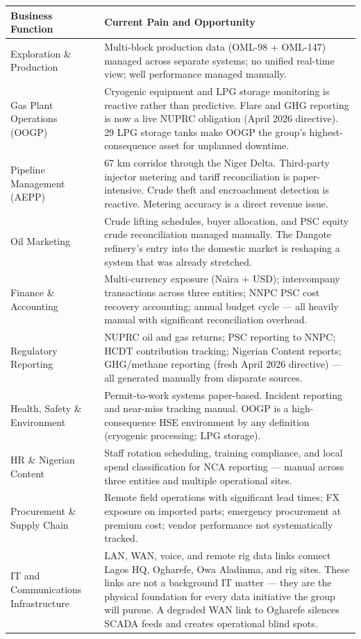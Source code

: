 \documentclass[10pt]{article}
\newcommand{\spacer}{\vspace{10pt}}
\begin{document}
\spacer
\small
\begin{tabularx}{\columnwidth}{@{}lX@{}}
\toprule
\textbf{Business Function} & \textbf{Current Pain and Opportunity} \\
\midrule
Exploration \& Production
  & Multi-block production data (OML-98 + OML-147) managed across separate
    systems; no unified real-time view; well performance managed manually. \\
Gas Plant Operations (OOGP)
  & Cryogenic equipment and LPG storage monitoring is reactive rather than
    predictive. Flare and GHG reporting is now a live NUPRC obligation
    (April 2026 directive). 29 LPG storage tanks make OOGP the group's
    highest-consequence asset for unplanned downtime. \\
Pipeline Management (AEPP)
  & 67 km corridor through the Niger Delta. Third-party injector metering
    and tariff reconciliation is paper-intensive. Crude theft and
    encroachment detection is reactive. Metering accuracy is a direct
    revenue issue. \\
Oil Marketing
  & Crude lifting schedules, buyer allocation, and PSC equity crude
    reconciliation managed manually. The Dangote refinery's entry into the
    domestic market is reshaping a system that was already stretched. \\
Finance \& Accounting
  & Multi-currency exposure (Naira + USD); intercompany transactions across
    three entities; NNPC PSC cost recovery accounting; annual budget cycle ---
    all heavily manual with significant reconciliation overhead. \\
Regulatory Reporting
  & NUPRC oil and gas returns; PSC reporting to NNPC; HCDT contribution
    tracking; Nigerian Content reports; GHG/methane reporting (fresh April
    2026 directive) --- all generated manually from disparate sources. \\
Health, Safety \& Environment
  & Permit-to-work systems paper-based. Incident reporting and near-miss
    tracking manual. OOGP is a high-consequence HSE environment by any
    definition (cryogenic processing; LPG storage). \\
HR \& Nigerian Content
  & Staff rotation scheduling, training compliance, and local spend
    classification for NCA reporting --- manual across three entities and
    multiple operational sites. \\
Procurement \& Supply Chain
  & Remote field operations with significant lead times; FX exposure on
    imported parts; emergency procurement at premium cost; vendor
    performance not systematically tracked. \\
IT and Communications Infrastructure
  & LAN, WAN, voice, and remote rig data links connect Lagos HQ, Ogharefe,
    Owa Aladinma, and rig sites. These links are not a background IT matter
    --- they are the physical foundation for every data initiative the group
    will pursue. A degraded WAN link to Ogharefe silences SCADA feeds and
    creates operational blind spots. \\
\bottomrule
\end{tabularx}
\normalsize
\end{document}

